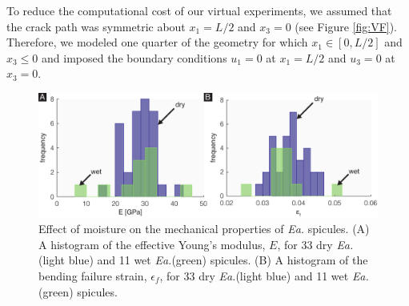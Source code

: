 \documentclass[12pt,onecolumn]{article}
\makeatletter
\newcommand{\EA}{\textit{Ea.\@}\xspace}
\makeatother
\begin{document}
\begin{bibunit}
To reduce the computational cost of our virtual experiments, we assumed that the crack path was symmetric about $x_1 = L/2$ and $x_3 = 0$ (see Figure \ref{fig:VF}). Therefore, we modeled one quarter of the geometry for which $x_1 \in [0,L/2]$ and $x_3\leq 0$ and imposed the boundary conditions $u_1 = 0$ at $x_1 = L/2$ and $u_3 = 0$ at $x_3 = 0$.




 	\begin{figure}[H]
	\centering
	\includegraphics[width=\textwidth]{../Figures/FigureHyd/FigureA3_V1.pdf}
	\caption{Effect of moisture on the mechanical properties of \EA spicules. (A) A histogram of the effective Young's modulus, $E$, for 33 dry \EA (light blue) and 11 wet \EA (green) spicules. (B) A histogram of the bending failure strain, $\epsilon_f$, for 33 dry \EA (light blue) and 11 wet \EA (green) spicules.}
	\label{fig:hyd}
	\end{figure}
	

\end{bibunit}
\end{document}
